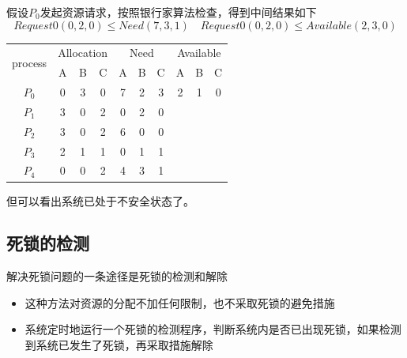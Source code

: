\documentclass[cs4size,a4paper,10pt]{ctexart}
\begin{document}
	假设$P_0$发起资源请求，按照银行家算法检查，得到中间结果如下
	$$Request0(0, 2, 0) \leq Need(7, 3, 1) \quad Request0(0, 2, 0) \leq Available(2, 3, 0)$$
	\begin{table}[H]
	\centering
	\begin{tabular}{c|ccc|ccc|ccc}
	\hline
	\multirow{2}{*}{process} & \multicolumn{3}{c|}{Allocation} & \multicolumn{3}{c|}{Need} & \multicolumn{3}{c}{Available} \\ \cline{2-10} 
							 & A         & B        & C        & A       & B      & C      & A        & B        & C       \\ \hline
	$P_0$                    & 0         & 3        & 0        & 7       & 2      & 3      & 2        & 1        & 0       \\ \hline
	$P_1$                    & 3         & 0        & 2        & 0       & 2      & 0      &          &          &         \\ \hline
	$P_2$                    & 3         & 0        & 2        & 6       & 0      & 0      &          &          &         \\ \hline
	$P_3$                    & 2         & 1        & 1        & 0       & 1      & 1      &          &          &         \\ \hline
	$P_4$                    & 0         & 0        & 2        & 4       & 3      & 1      &          &          &         \\ \hline
	\end{tabular}
	\end{table}
	但可以看出系统已处于不安全状态了。

	\subsection{死锁的检测}
	解决死锁问题的一条途径是死锁的检测和解除
	\begin{itemize}
		\item 这种方法对资源的分配不加任何限制，也不采取死锁的避免措施
		\item 系统定时地运行一个死锁的检测程序，判断系统内是否已出现死锁，如果检测到系统已发生了死锁，再采取措施解除
	\end{itemize}
\end{document}
